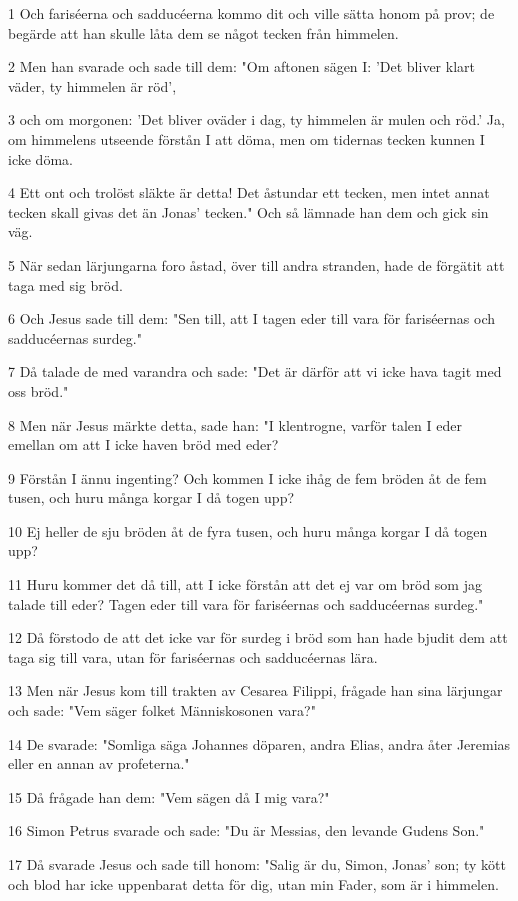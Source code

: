 \par 1 Och fariséerna och sadducéerna kommo dit och ville sätta honom på prov; de begärde att han skulle låta dem se något tecken från himmelen.
\par 2 Men han svarade och sade till dem: "Om aftonen sägen I: 'Det bliver klart väder, ty himmelen är röd',
\par 3 och om morgonen: 'Det bliver oväder i dag, ty himmelen är mulen och röd.' Ja, om himmelens utseende förstån I att döma, men om tidernas tecken kunnen I icke döma.
\par 4 Ett ont och trolöst släkte är detta! Det åstundar ett tecken, men intet annat tecken skall givas det än Jonas' tecken." Och så lämnade han dem och gick sin väg.
\par 5 När sedan lärjungarna foro åstad, över till andra stranden, hade de förgätit att taga med sig bröd.
\par 6 Och Jesus sade till dem: "Sen till, att I tagen eder till vara för fariséernas och sadducéernas surdeg."
\par 7 Då talade de med varandra och sade: "Det är därför att vi icke hava tagit med oss bröd."
\par 8 Men när Jesus märkte detta, sade han: "I klentrogne, varför talen I eder emellan om att I icke haven bröd med eder?
\par 9 Förstån I ännu ingenting? Och kommen I icke ihåg de fem bröden åt de fem tusen, och huru många korgar I då togen upp?
\par 10 Ej heller de sju bröden åt de fyra tusen, och huru många korgar I då togen upp?
\par 11 Huru kommer det då till, att I icke förstån att det ej var om bröd som jag talade till eder? Tagen eder till vara för fariséernas och sadducéernas surdeg."
\par 12 Då förstodo de att det icke var för surdeg i bröd som han hade bjudit dem att taga sig till vara, utan för fariséernas och sadducéernas lära.
\par 13 Men när Jesus kom till trakten av Cesarea Filippi, frågade han sina lärjungar och sade: "Vem säger folket Människosonen vara?"
\par 14 De svarade: "Somliga säga Johannes döparen, andra Elias, andra åter Jeremias eller en annan av profeterna."
\par 15 Då frågade han dem: "Vem sägen då I mig vara?"
\par 16 Simon Petrus svarade och sade: "Du är Messias, den levande Gudens Son."
\par 17 Då svarade Jesus och sade till honom: "Salig är du, Simon, Jonas' son; ty kött och blod har icke uppenbarat detta för dig, utan min Fader, som är i himmelen.
